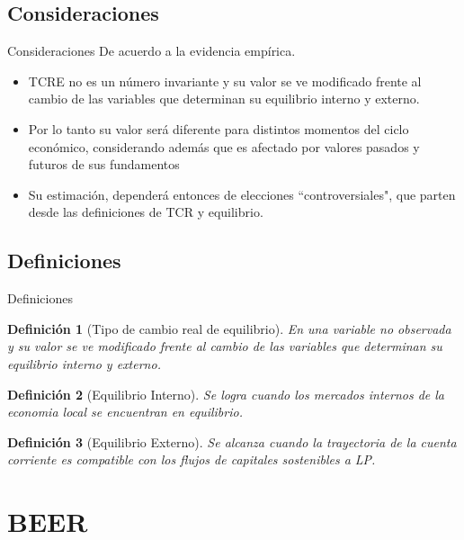 \documentclass{beamer}
\newtheorem{definic}{Definición}[section]
\begin{document}
\subsection[Consideraciones]{Consideraciones}
\begin{frame} {Consideraciones}
De acuerdo a la evidencia empírica.
\begin{itemize}
\item TCRE no es un número invariante y su valor se ve modificado frente al cambio de las variables que determinan su equilibrio interno y externo. 
\item Por lo tanto su valor será diferente para distintos momentos del ciclo económico, considerando además que es afectado por valores pasados y futuros de sus fundamentos
\item Su estimación, dependerá entonces de elecciones ``controversiales", que parten desde las definiciones de TCR y equilibrio.     
\end{itemize}
\end{frame}

\subsection[Definiciones]{Definiciones}
\begin{frame}{Definiciones}
\begin{definic}[Tipo de cambio real de equilibrio]
En una variable no observada y su valor se ve modificado frente al cambio de las variables que determinan su equilibrio interno y externo.
\end{definic}
\begin{definic}[Equilibrio Interno]
Se logra cuando los mercados internos de la economia local se encuentran en equilibrio.
\end{definic}
\begin{definic}[Equilibrio Externo]
Se alcanza cuando la trayectoria de la cuenta corriente es compatible con los flujos de capitales sostenibles a LP.
\end{definic}
\end{frame}

\section[BEER]{BEER}
\end{document}
